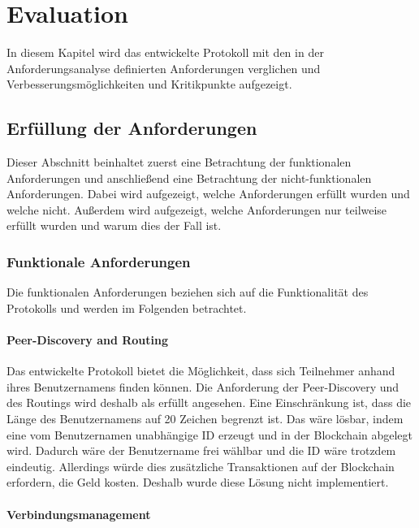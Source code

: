 \chapter{Evaluation}
\label{chap:evaluation}

In diesem Kapitel wird das entwickelte Protokoll mit den in der Anforderungsanalyse definierten Anforderungen verglichen und Verbesserungsmöglichkeiten und Kritikpunkte aufgezeigt.


\section{Erfüllung der Anforderungen}
\label{sec:erfuellung_der_anforderungen}

Dieser Abschnitt beinhaltet zuerst eine Betrachtung der funktionalen Anforderungen und anschließend eine Betrachtung der nicht-funktionalen Anforderungen. Dabei wird aufgezeigt, welche Anforderungen erfüllt wurden und welche nicht. Außerdem wird aufgezeigt, welche Anforderungen nur teilweise erfüllt wurden und warum dies der Fall ist.  


\subsection{Funktionale Anforderungen}
\label{subsec:funktionale_anforderungen}

Die funktionalen Anforderungen beziehen sich auf die Funktionalität des Protokolls und werden im Folgenden betrachtet.

\subsubsection{Peer-Discovery and Routing}
\label{subsubsec:peer_discovery_and_routing}

Das entwickelte Protokoll bietet die Möglichkeit, dass sich Teilnehmer anhand ihres Benutzernamens finden können. Die Anforderung der Peer-Discovery und des Routings wird deshalb als erfüllt angesehen. Eine Einschränkung ist, dass die Länge des Benutzernamens auf 20 Zeichen begrenzt ist. Das wäre lösbar, indem eine vom Benutzernamen unabhängige ID erzeugt und in der Blockchain abgelegt wird. Dadurch wäre der Benutzername frei wählbar und die ID wäre trotzdem eindeutig. Allerdings würde dies zusätzliche Transaktionen auf der Blockchain erfordern, die Geld kosten. Deshalb wurde diese Lösung nicht implementiert.


\subsubsection{Verbindungsmanagement}

